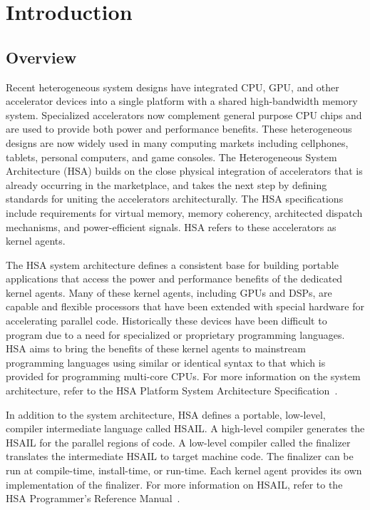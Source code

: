 \documentclass[oneside]{book}
\begin{document}
\clearpage
{}
\setcounter{page}{1}

\chapter{Introduction} \label{index}
\vspace{-7mm}
\section{Overview}\label{overview}
\vspace{-3mm}
Recent heterogeneous system designs have integrated CPU, GPU, and other
accelerator devices into a single platform with a shared high-bandwidth memory
system.  Specialized accelerators now complement general purpose CPU chips and
are used to provide both power and performance benefits.  These
heterogeneous designs are now widely used in many computing markets including
cellphones, tablets, personal computers, and game consoles. The Heterogeneous
System Architecture (HSA) builds on the close physical integration of
accelerators that is already occurring in the marketplace, and takes the next
step by defining standards for uniting the accelerators architecturally. The HSA
specifications include requirements for virtual memory, memory coherency,
architected dispatch mechanisms, and power-efficient signals. HSA refers to
these accelerators as kernel agents.

The HSA system architecture defines a consistent base for building portable
applications that access the power and performance benefits of the dedicated
kernel agents. Many of these kernel agents, including GPUs and DSPs, are capable
and flexible processors that have been extended with special hardware for
accelerating parallel code. Historically these devices have been difficult to
program due to a need for specialized or proprietary programming languages. HSA
aims to bring the benefits of these kernel agents to mainstream programming
languages using similar or identical syntax to that which is provided for
programming multi-core CPUs. For more information on the system architecture,
refer to the HSA Platform System Architecture Specification~\cite{sar}.

In addition to the system architecture, HSA defines a portable, low-level,
compiler intermediate language called HSAIL.  A high-level compiler
generates the HSAIL for the parallel regions of code. A low-level compiler
called the finalizer translates the intermediate HSAIL to target machine
code. The finalizer can be run at compile-time, install-time, or run-time. Each
kernel agent provides its own implementation of the finalizer.  For more
information on HSAIL, refer to the HSA Programmer's Reference Manual~\cite{prm}.
\end{document}
